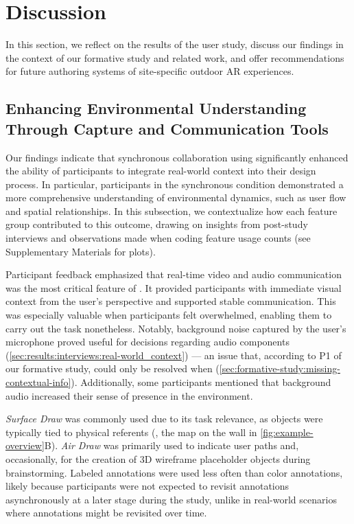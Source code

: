 \section{Discussion}\label{sec:discussion}
In this section, we reflect on the results of the user study, discuss our findings in the context of our formative study and related work, and offer recommendations for future authoring systems of site-specific outdoor AR experiences.

\subsection{Enhancing Environmental Understanding Through Capture and Communication Tools}\label{sec:discussion:environmental_context}
Our findings indicate that synchronous collaboration using \SystemName significantly enhanced the ability of \exsitu participants to integrate real-world context into their design process. In particular, \exsitu participants in the synchronous condition demonstrated a more comprehensive understanding of environmental dynamics, such as user flow and spatial relationships. In this subsection, we contextualize how each feature group contributed to this outcome, drawing on insights from post-study interviews and observations made when coding feature usage counts (see Supplementary Materials for plots).

Participant feedback emphasized that real-time video and audio communication was the most critical feature of \SystemName. It provided \exsitu participants with immediate visual context from the \insitu user’s perspective and supported stable communication. This was especially valuable when \insitu participants felt overwhelmed, enabling them to carry out the task nonetheless. Notably, background noise captured by the \insitu user’s microphone proved useful for decisions regarding audio components (\cref{sec:results:interviews:real-world_context}) --- an issue that, according to P1 of our formative study, could only be resolved when \insitu[ ] (\cref{sec:formative-study:missing-contextual-info}). Additionally, some \exsitu participants mentioned that background audio increased their sense of presence in the \insitu environment.

\textit{Surface Draw} was commonly used due to its task relevance, as objects were typically tied to physical referents (\eg, the map on the wall in \cref{fig:example-overview}B). \textit{Air Draw} was primarily used to indicate user paths and, occasionally, for the creation of 3D wireframe placeholder objects during brainstorming. Labeled annotations were used less often than color annotations, likely because \exsitu participants were not expected to revisit annotations asynchronously at a later stage during the study, unlike in real-world scenarios where annotations might be revisited over time.

